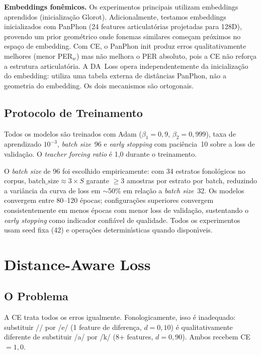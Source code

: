 \documentclass[12pt]{article}
\newcommand{\ipaE}{\textipa{E}}%
\begin{document}
\textbf{Embeddings fon\^emicos.}
Os experimentos principais utilizam embeddings aprendidos (inicializa\c{c}\~ao
Glorot). Adicionalmente, testamos embeddings inicializados com PanPhon
(24 features articulat\'orias projetadas para 128D), provendo um prior
geom\'etrico onde fonemas similares come\c{c}am pr\'oximos no espa\c{c}o
de embedding. Com CE, o PanPhon init produz erros qualitativamente
melhores (menor PER$_w$) mas n\~ao melhora o PER absoluto, pois a CE
n\~ao refor\c{c}a a estrutura articulat\'oria. A DA~Loss opera
independentemente da inicializa\c{c}\~ao do embedding: utiliza uma
tabela externa de dist\^ancias PanPhon, n\~ao a geometria do embedding.
Os dois mecanismos s\~ao ortogonais.

\subsection{Protocolo de Treinamento}

Todos os modelos s\~ao treinados com Adam ($\beta_1{=}0{,}9$,
$\beta_2{=}0{,}999$), taxa de aprendizado $10^{-3}$,
\emph{batch size}~96 e \emph{early stopping} com paci\^encia~10
sobre a loss de valida\c{c}\~ao. O \emph{teacher forcing ratio}
\'e 1,0 durante o treinamento.

O \emph{batch size} de 96 foi escolhido empiricamente: com 34 estratos
fonol\'ogicos no corpus, $\text{batch\_size} \approx 3 \times S$
garante $\geq$3 amostras por estrato por batch, reduzindo a
vari\^ancia da curva de loss em ${\sim}$50\% em rela\c{c}\~ao a
\emph{batch size}~32. Os modelos convergem entre 80--120 \'epocas;
configura\c{c}\~oes superiores convergem consistentemente em menos
\'epocas com menor loss de valida\c{c}\~ao, sustentando o
\emph{early stopping} como indicador confi\'avel de qualidade.
Todos os experimentos usam seed fixa (42) e opera\c{c}\~oes
determin\'{\i}sticas quando dispon\'{\i}veis.

\section{Distance-Aware Loss}

\subsection{O Problema}

A CE trata todos os erros igualmente. Fonologicamente, isso \'e
inadequado: substituir /\ipaE{}/ por /e/ (1 feature de diferen\c{c}a,
$d{=}0{,}10$) \'e qualitativamente diferente de substituir /a/ por /k/
(8+ features, $d{=}0{,}90$). Ambos recebem CE${}= 1{,}0$.
\end{document}
